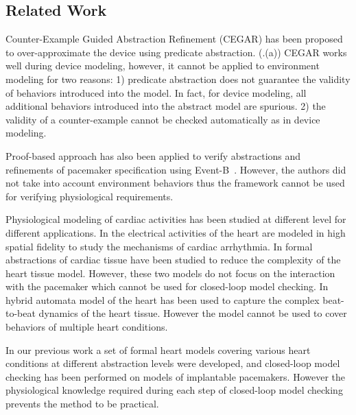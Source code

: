 \subsection{Related Work}
Counter-Example Guided Abstraction Refinement (CEGAR) \cite{CEGAR} has been proposed to over-approximate the device using predicate abstraction. (.(a))
CEGAR works well during device modeling, however, it cannot be applied to environment modeling for two reasons: 1) predicate abstraction does not guarantee the validity of behaviors introduced into the model. In fact, for device modeling, all additional behaviors introduced into the abstract model are spurious. 2) the validity of a counter-example cannot be checked automatically as in device modeling. 

Proof-based approach has also been applied to verify  abstractions and refinements of pacemaker specification using Event-B~\cite{eventb}. However, the authors did not take into account environment behaviors thus the framework cannot be used for verifying physiological requirements.  

Physiological modeling of cardiac activities has been studied at different level for different applications. In \cite{natalia} the electrical activities of the heart are modeled in high spatial fidelity to study the mechanisms of cardiac arrhythmia. In \cite{radu} formal abstractions of cardiac tissue have been studied to reduce the complexity of the heart tissue model. However, these two models do not focus on the interaction with the pacemaker which cannot be used for closed-loop model checking. In \cite{marta} hybrid automata model of the heart has been used to capture the complex beat-to-beat dynamics of the heart tissue. However the model cannot be used to cover behaviors of multiple heart conditions.

In our previous work \cite{sttt13} a set of formal heart models covering various heart conditions at different abstraction levels were developed, and closed-loop model checking has been performed on models of implantable pacemakers. 
However the physiological knowledge required during each step of closed-loop model checking prevents the method to be practical.

